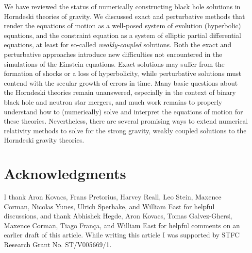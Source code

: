 \documentclass{ws-ijmpd}
\begin{document}
We have reviewed the status of numerically constructing black hole
solutions in Horndeski theories of gravity.
We discussed exact and perturbative
methods that render the equations of motion
as a well-posed system of evolution (hyperbolic) equations,
and the constraint equation as a system of elliptic partial
differential equations, at least for so-called \emph{weakly-coupled} solutions.
Both the exact and perturbative approaches introduce new difficulties
not encountered in the simulations of the Einstein equations. 
Exact solutions may suffer from the formation of shocks or
a loss of hyperbolicity, while perturbative solutions must contend
with the secular growth of errors in time.
Many basic questions about the Horndeski theories remain unanswered,
especially in the context of binary black hole and neutron star mergers,
and much work remains to properly understand how to (numerically)
solve and interpret the equations of motion for these theories.
Nevertheless, there are several promising ways to extend numerical relativity  
methods to solve for the strong gravity, weakly coupled 
solutions to the Horndeski gravity theories.

\section*{Acknowledgments}

 I thank  
 Aron Kovacs, Frans Pretorius,
 Harvey Reall, Leo Stein, Maxence Corman, 
 Nicolas Yunes, Ulrich Sperhake,  and William East
 for helpful discussions,
 and thank Abhishek Hegde, Aron Kovacs, 
 Tomas Galvez-Ghersi, Maxence Corman, 
 Tiago Fran\c{c}a, and William East
 for helpful comments on an earlier
 draft of this article.
 While writing this article I was
 supported by STFC Research Grant No. ST/V005669/1.

\appendix

\end{document}
